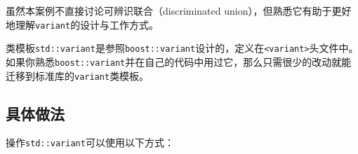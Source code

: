 
虽然本案例不直接讨论可辨识联合（discriminated union），但熟悉它有助于更好地理解\texttt{variant}的设计与工作方式。



类模板\texttt{std::\allowbreak{}variant}是参照\texttt{boost::\allowbreak{}variant}设计的，定义在\texttt{<\allowbreak{}variant>}头文件中。如果你熟悉\texttt{boost::\allowbreak{}variant}并在自己的代码中用过它，那么只需很少的改动就能迁移到标准库的\texttt{variant}类模板。



\subsection{具体做法}



操作\texttt{std::\allowbreak{}variant}可以使用以下方式：




